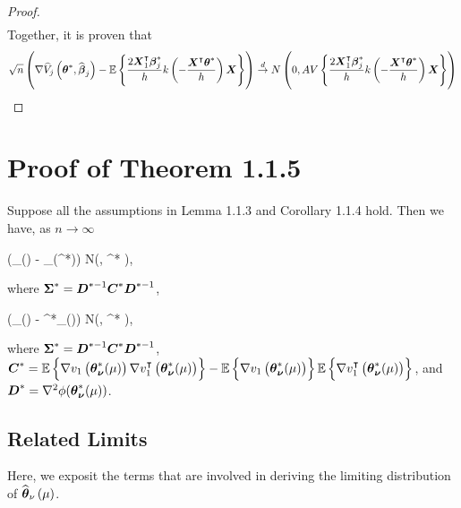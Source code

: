 \begin{proof}
\begin{gather*}
\end{gather*}
Together, it is proven that
	\begin{gather}
\begin{flalign*}
\sqrt{n}\left(\nabla\widehat{V}_j\left(\boldsymbol{\theta}^* , \widehat{\boldsymbol{\beta}}_j\right) - \mathbb{E}\left\{\frac{2\boldsymbol{X}_{1}^{\intercal}\boldsymbol{\beta}^*_j}{h}k\left(-\frac{\boldsymbol{X}^{\intercal}\boldsymbol{\theta}^*}{h}\right)\boldsymbol{X}\right\}\right)\overset{d}{\to}N\left(0,AV\left\{\frac{2\boldsymbol{X}_1^{\intercal}\boldsymbol{\beta}^*_j}{h}k\left(-\frac{\boldsymbol{X}^{\intercal}\boldsymbol{\theta}^*}{h}\right)\boldsymbol{X}\right\}\right)
\end{flalign*}
\end{gather}
\end{proof}		

\section{Proof of Theorem 1.1.5}
\begin{theorem}
	Suppose all the assumptions in Lemma 1.1.3 and Corollary 1.1.4 hold. Then we have, as $n\to \infty$
	\begin{flalign*}
	\lt(\widehat{\bs{\theta}}_{\nu}(\mu) - \bs{\theta}_{\bs{\nu}}(\mu^*)\rt)  N\lt(, \bs{\Sigma}^* \rt),
	\end{flalign*}
	where $\boldsymbol{\Sigma}^* = \boldsymbol{D}^{*-1}\boldsymbol{C}^{*}\boldsymbol{D}^{*-1}$, 
	
	\begin{flalign*}
	\lt(\widehat{\bs{\theta}}_{\nu}(\mu) - \bs{\theta}^*_{\bs{\nu}}(\mu)\rt)  N\lt(, \bs{\Sigma}^* \rt),
	\end{flalign*}
	where $\boldsymbol{\Sigma}^* = \boldsymbol{D}^{*-1}\boldsymbol{C}^{*}\boldsymbol{D}^{*-1}$, \\
	$\boldsymbol{C}^* =\mathbb{E}\left\{  \nabla v_1\left(\boldsymbol{\theta}^*_{\boldsymbol{\nu}}(\mu)\right)\nabla v^{\intercal}_1\left(\boldsymbol{\theta}^*_{\boldsymbol{\nu}}(\mu)\right) \right\} - \mathbb{E}\left\{\nabla v_1\left(\boldsymbol{\theta}^*_{\boldsymbol{\nu}}(\mu)\right)\right\} \mathbb{E}\left\{\nabla v^{\intercal}_1\left(\boldsymbol{\theta}^*_{\boldsymbol{\nu}}(\mu)\right)\right\}$, and $\boldsymbol{D}^*  =  \nabla^2 \phi(\boldsymbol{\theta}^*_{\boldsymbol{\nu}}(\mu))$.
\end{theorem}

\subsection{Related Limits}
Here, we exposit the terms that are involved in deriving the limiting distribution of $\widehat{\boldsymbol{\theta}}_{\nu}\left(\mu\right)$. 

